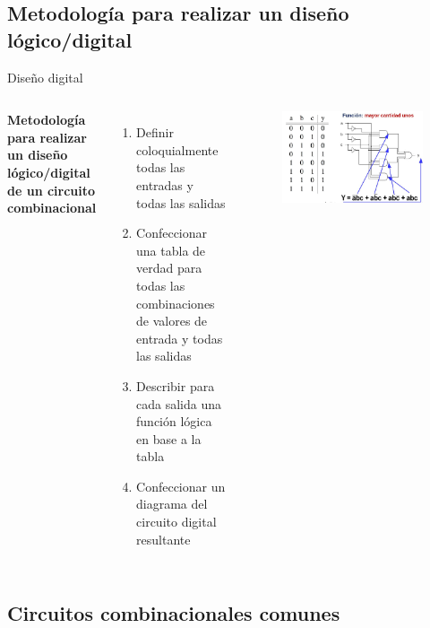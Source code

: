 \documentclass[aspectratio=169,compress]{beamer}
\begin{document}
\begin{footnotesize}
\subsection{Metodología para realizar un diseño lógico/digital}

\begin{frame}{Diseño digital}

 \begin{columns}[onlytextwidth,T]
      \column{\dimexpr\linewidth-60mm-5mm}
\textbf{Metodología para realizar un diseño lógico/digital de un circuito combinacional}
\bigskip
\begin{enumerate}
\item Definir coloquialmente todas las entradas y todas las salidas
\item Confeccionar una tabla de verdad para todas las combinaciones de valores de entrada y todas las salidas
\item Describir para cada salida una función lógica en base a la tabla
\item Confeccionar un diagrama del circuito digital resultante
\end{enumerate}

	\column{60mm}

\begin{figure}
\includegraphics[scale=0.18]{images/construcciondigital.jpg} 
\end{figure}
  \end{columns}
\end{frame}


\subsection{Circuitos combinacionales comunes}



\end{footnotesize}
\end{document}
